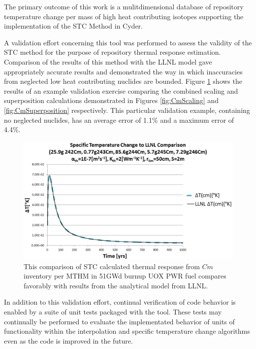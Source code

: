 
The primary outcome of this work is a mulitdimensional database of repository temperature 
change per mass of high heat contributing isotopes supporting the implementation 
of the \gls{STC} Method in Cyder. 

A validation effort concerning this tool was performed to assess the validity of 
the \gls{STC} method for the purpose of repository thermal response estimation.  
Comparison of the results of this method with the \gls{LLNL} model gave 
appropriately accurate results and demonstrated the way in which inaccuracies 
from neglected low heat contributing nuclides are bounded. Figure 
\ref{fig:CmValidation} shows the results of an example validation exercise 
comparing the combined scaling and  superposition calculations demonstrated in 
Figures \ref{fig:CmScaling} and \ref{fig:CmSuperposition} respectively. This 
particular validation example, containing no neglected nuclides, has 
an average error of 1.1\% and a maximum error of 4.4\%.

\begin{figure}[htp!]
\begin{center}
\includegraphics[width=\columnwidth]{images/CmValidation.eps}
\end{center}
\caption{This comparison of \gls{STC} calculated thermal response from $Cm$ 
inventory per MTHM in 51GWd burnup UOX PWR fuel compares favorably with results 
from the analytical model from LLNL.} 
\label{fig:CmValidation}
\end{figure}

In addition to this validation effort, continual verification of code behavior
is enabled by a suite of unit tests packaged with the tool. These tests may
continually be performed to evaluate the implementated behavior of units of
functionality within the interpolation and specific temperature change
algorithms even as the code is improved in the future.  
